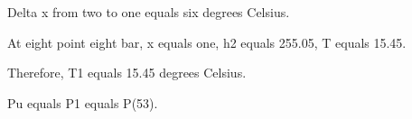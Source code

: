 Delta x from two to one equals six degrees Celsius.

At eight point eight bar, x equals one, h2 equals 255.05, T equals 15.45.

Therefore, T1 equals 15.45 degrees Celsius.

Pu equals P1 equals P(53).